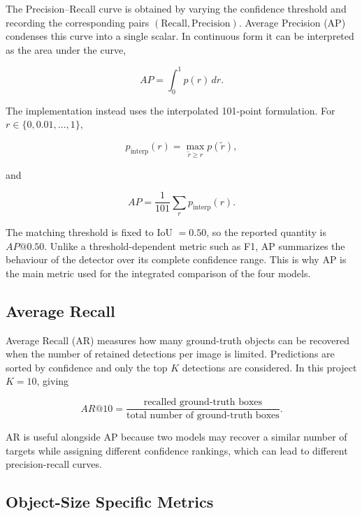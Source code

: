 \documentclass[11pt,a4paper]{article}
\begin{document}
The Precision--Recall curve is obtained by varying the confidence threshold
and recording the corresponding pairs $(\mathrm{Recall},\mathrm{Precision})$.
Average Precision (AP) condenses this curve into a single scalar. In
continuous form it can be interpreted as the area under the curve,

\begin{equation}
AP=\int_0^1 p(r)\,dr.
\end{equation}

The implementation instead uses the interpolated 101-point formulation. For
$r\in\{0,0.01,\ldots,1\}$,

\begin{equation}
p_{\mathrm{interp}}(r)=\max_{\tilde r\ge r}p(\tilde r),
\end{equation}

and

\begin{equation}
AP=\frac{1}{101}\sum_r p_{\mathrm{interp}}(r).
\end{equation}

The matching threshold is fixed to IoU $=0.50$, so the reported quantity is
$AP@0.50$. Unlike a threshold-dependent metric such as F1, AP summarizes the
behaviour of the detector over its complete confidence range. This is why AP
is the main metric used for the integrated comparison of the four models.

\subsection{Average Recall}
\label{subsec:average_recall}

Average Recall (AR) measures how many ground-truth objects can be recovered
when the number of retained detections per image is limited. Predictions are
sorted by confidence and only the top $K$ detections are considered. In this
project $K=10$, giving

\begin{equation}
AR@10=
\frac{\text{recalled ground-truth boxes}}
{\text{total number of ground-truth boxes}}.
\end{equation}

AR is useful alongside AP because two models may recover a similar number of
targets while assigning different confidence rankings, which can lead to
different precision-recall curves.

\subsection{Object-Size Specific Metrics}
\label{subsec:size_metrics}
\end{document}
